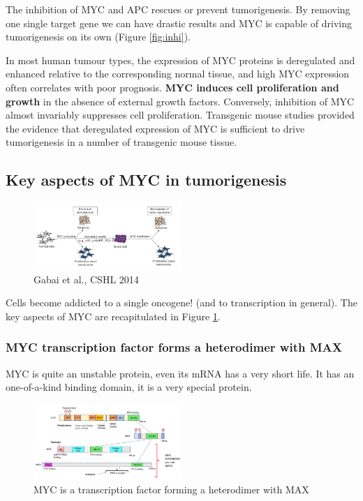 The inhibition of MYC and APC rescues or prevent tumorigenesis. By removing one single target gene we can have drastic results and MYC is capable of driving tumorigenesis on its own (Figure \ref{fig:inhi}).

In most human tumour types, the expression of MYC proteins is deregulated and enhanced relative to the corresponding normal tissue, and high MYC expression often correlates with poor prognosis. \textbf{MYC induces cell proliferation and growth} in the absence of external growth factors. Conversely, inhibition of MYC almost invariably suppresses cell proliferation.
Transgenic mouse studies provided the evidence that deregulated expression of MYC is sufficient to drive tumorigenesis in a number of transgenic mouse tissue.

\hypertarget{key-aspect-of-myc-in-tumorigenesis}{%
\subsection{Key aspects of MYC in tumorigenesis}\label{key-aspect-of-myc-in-tumorigenesis}}

\begin{figure}
\centering
\includegraphics[width=0.5\textwidth]{../_resources/18345a0e70ca9e50883ca61f93ad3405.png}
\caption{Gabai et al., CSHL 2014}
\label{fig:key}
\end{figure}

Cells become addicted to a single oncogene! (and to transcription in general). The key aspects of MYC are recapitulated in Figure \ref{fig:key}.

\hypertarget{myc-transcription-factor-forms-a-heterodimer-with-max}{%
\subsubsection{MYC transcription factor forms a heterodimer with MAX}\label{myc-transcription-factor-forms-a-heterodimer-with-max}}

MYC is quite an unstable protein, even its mRNA has a very short life. It has an one-of-a-kind binding domain, it is a very special protein.


\begin{figure}
\centering
\includegraphics[width=0.5\textwidth]{../_resources/01adbb32a69ee3baec1bf9bddd890f52.png}
\caption{ MYC is a transcription factor forming a heterodimer with MAX}
\label{fig:myc}
\end{figure}


